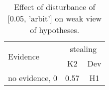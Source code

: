 \begin{table}\begin{tabular}{l|cc}\toprule\multirow{2}{*}{Evidence} & \multicolumn{2}{c}{stealing}\\& {K2} & {Dev}\\\midrule
no evidence, 0 & \cellcolor{Bittersweet}0.57&\cellcolor{Bittersweet}H1\\\bottomrule\end{tabular}\caption{Effect of disturbance of [0.05, 'arbit'] on weak view of hypotheses.}\end{table}